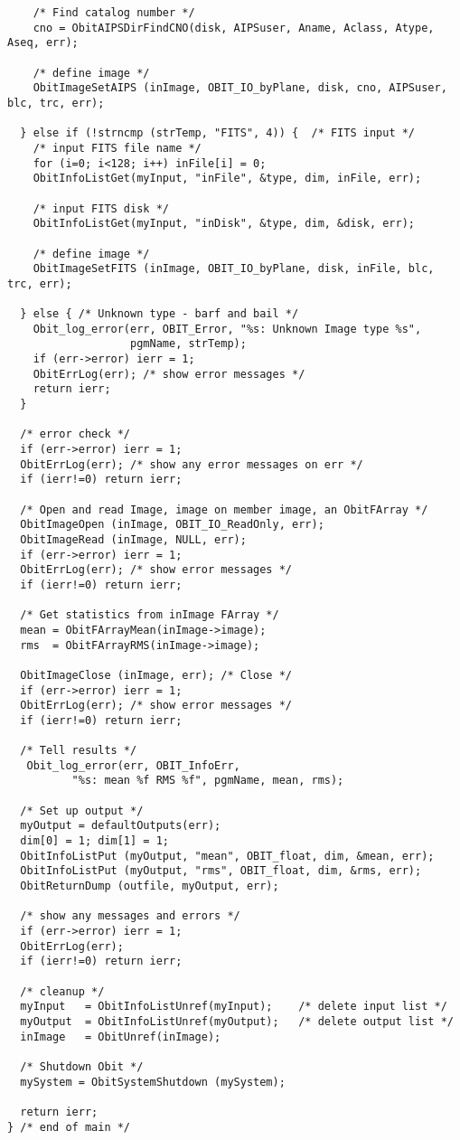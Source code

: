 \documentclass[11pt]{article}
\begin{document}
\begin{verbatim}
    /* Find catalog number */
    cno = ObitAIPSDirFindCNO(disk, AIPSuser, Aname, Aclass, Atype, Aseq, err);
    
    /* define image */
    ObitImageSetAIPS (inImage, OBIT_IO_byPlane, disk, cno, AIPSuser, blc, trc, err);
    
  } else if (!strncmp (strTemp, "FITS", 4)) {  /* FITS input */
    /* input FITS file name */
    for (i=0; i<128; i++) inFile[i] = 0;
    ObitInfoListGet(myInput, "inFile", &type, dim, inFile, err);
    
    /* input FITS disk */
    ObitInfoListGet(myInput, "inDisk", &type, dim, &disk, err);

    /* define image */
    ObitImageSetFITS (inImage, OBIT_IO_byPlane, disk, inFile, blc, trc, err);
    
  } else { /* Unknown type - barf and bail */
    Obit_log_error(err, OBIT_Error, "%s: Unknown Image type %s", 
                   pgmName, strTemp);
    if (err->error) ierr = 1;
    ObitErrLog(err); /* show error messages */
    return ierr;
  }

  /* error check */
  if (err->error) ierr = 1;
  ObitErrLog(err); /* show any error messages on err */
  if (ierr!=0) return ierr;

  /* Open and read Image, image on member image, an ObitFArray */
  ObitImageOpen (inImage, OBIT_IO_ReadOnly, err);
  ObitImageRead (inImage, NULL, err);
  if (err->error) ierr = 1;
  ObitErrLog(err); /* show error messages */
  if (ierr!=0) return ierr;

  /* Get statistics from inImage FArray */
  mean = ObitFArrayMean(inImage->image);
  rms  = ObitFArrayRMS(inImage->image);

  ObitImageClose (inImage, err); /* Close */
  if (err->error) ierr = 1;
  ObitErrLog(err); /* show error messages */
  if (ierr!=0) return ierr;

  /* Tell results */
   Obit_log_error(err, OBIT_InfoErr, 
		  "%s: mean %f RMS %f", pgmName, mean, rms);

  /* Set up output */
  myOutput = defaultOutputs(err);
  dim[0] = 1; dim[1] = 1;
  ObitInfoListPut (myOutput, "mean", OBIT_float, dim, &mean, err);
  ObitInfoListPut (myOutput, "rms", OBIT_float, dim, &rms, err);
  ObitReturnDump (outfile, myOutput, err);

  /* show any messages and errors */
  if (err->error) ierr = 1;
  ObitErrLog(err);
  if (ierr!=0) return ierr;
  
  /* cleanup */
  myInput   = ObitInfoListUnref(myInput);    /* delete input list */
  myOutput  = ObitInfoListUnref(myOutput);   /* delete output list */
  inImage   = ObitUnref(inImage);
  
  /* Shutdown Obit */
  mySystem = ObitSystemShutdown (mySystem);
  
  return ierr;
} /* end of main */

\end{verbatim}
\end{document}

